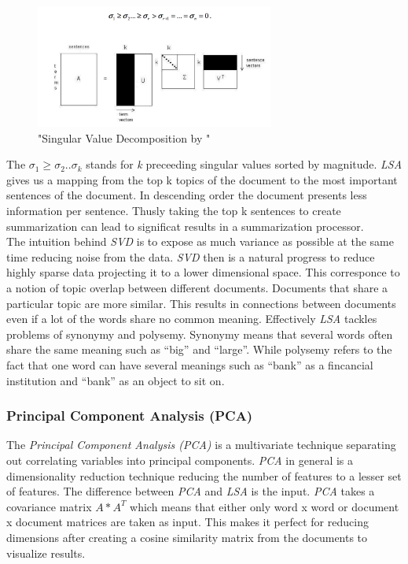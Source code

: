       \begin{figure}[h!]
        \centering
          \includegraphics[width=0.7\textwidth]{svd_lsa.png}
          \caption{"Singular Value Decomposition by \cite{SumLSASteinberger2004}"}
          \label{svd_lsa}
      \end{figure}

      The $\sigma_1 \geq \sigma_2..\sigma_k$ stands for \emph{k} preceeding singular values sorted by magnitude. \emph{LSA} gives us a mapping from the top k topics of the document to the most important sentences of the document. In descending order the document presents less information per sentence. Thusly taking the top k sentences to create summarization can lead to significat results in a summarization processor. \cite{SumLSASteinberger2004}\\

      The intuition behind \emph{SVD} is to expose as much variance as possible at the same time reducing noise from the data. \emph{SVD} then is a natural progress to reduce highly sparse data projecting it to a lower dimensional space. This corresponce to a notion of topic overlap between different documents.
      Documents that share a particular topic are more similar. This results in connections between documents even if a lot of the words share no common meaning. Effectively \emph{LSA} tackles problems of synonymy and polysemy. Synonymy means that several words often share the same meaning such as ``big'' and ``large''. While polysemy refers to the fact that one word can have several meanings such as ``bank'' as a fincancial institution and ``bank'' as an object to sit on.

    \subsubsection{Principal Component Analysis (PCA)}
    The \emph{Principal Component Analysis (PCA)} is a multivariate technique separating out correlating variables into principal components. \emph{PCA} in general is a dimensionality reduction technique reducing the number of features to a lesser set of features. The difference between \emph{PCA} and \emph{LSA} is the input. \emph{PCA} takes a covariance matrix $A*A^{T}$ which means that either only word x word or document x document matrices are taken as input. This makes it perfect for reducing dimensions after creating a cosine similarity matrix from the documents to visualize results.

